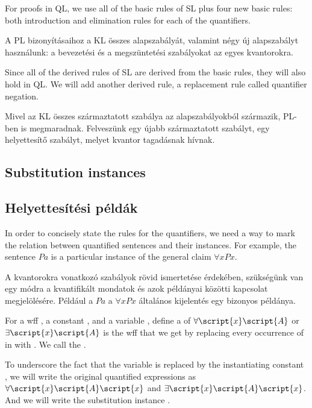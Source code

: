 For proofs in QL, we use all of the basic rules of SL plus four new basic rules: both introduction and elimination rules for each of the quantifiers.

A PL bizonyításaihoz a KL összes alapszabályát, valamint négy új alapszabályt használunk: a bevezetési és a megszüntetési szabályokat az egyes kvantorokra.

Since all of the derived rules of SL are derived from the basic rules, they will also hold in QL. We will add another derived rule, a replacement rule called quantifier negation.

Mivel az KL összes származtatott szabálya az alapszabályokból származik, PL-ben is megmaradnak. Felveszünk egy újabb származtatott szabályt, egy helyettesítő szabályt, melyet kvantor tagadásnak hívnak.

\subsection{Substitution instances}

\subsection{Helyettesítési példák}

In order to concisely state the rules for the quantifiers, we need a way to mark the relation between quantified sentences and their instances. For example, the sentence $Pa$ is a particular instance of the general claim $\forall x Px$.

A kvantorokra vonatkozó szabályok rövid ismertetése érdekében, szükségünk van egy módra a kvantifikált mondatok és azok példányai közötti kapcsolat megjelölésére. Például a $Pa$ a $\forall x Px$ általános kijelentés egy bizonyos példánya.



For a wff , a constant , and a variable , define a  of $\forall \script{x}\script{A}$ or $\exists \script{x}\script{A}$ is the wff that we get by replacing every occurrence of  in  with . We call  the .

To underscore the fact that the variable  is replaced by the instantiating constant , we will write the original quantified expressions as $\forall \script{x}\script{A}\script{x}$ and $\exists \script{x}\script{A}\script{x}$. And we will write the substitution instance .

